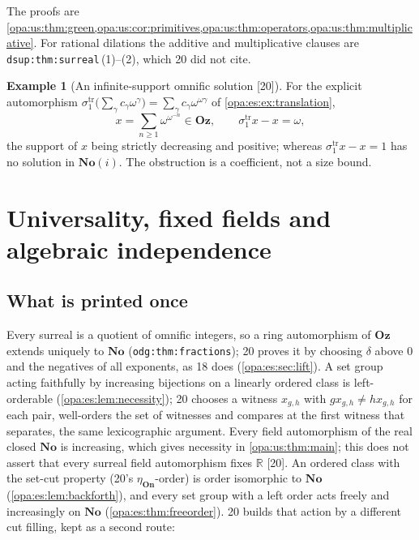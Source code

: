 \documentclass[11pt,oneside]{article}
\numberwithin{equation}{section}
\theoremstyle{definition}
\newtheorem{example}[example]{Example}
\theoremstyle{remark}
\newcommand{\No}{\mathbf{No}}
\newcommand{\Oz}{\mathbf{Oz}}
\newcommand{\SC}{\mathbf{No}(i)}
\newcommand{\R}{\mathbb R}
\newcommand{\src}[1]{\textup{\textsf{\small[#1]}}}
\newcommand{\lbl}[1]{\nolinkurl{#1}}
\newcommand{\On}{\mathbf{On}}
\begin{document}
The proofs are \cref{opa:us:thm:green,opa:us:cor:primitives,opa:us:thm:operators,opa:us:thm:multiplicative}. For rational dilations the
additive and multiplicative clauses are \lbl{dsup:thm:surreal}\,(1)--(2), which 20 did not cite.

\begin{example}[An infinite-support omnific solution \src{20}]\label{opa:us:ex:opening}
For the explicit automorphism $\sigma^{\mathrm{tr}}_1\bigl(\sum_\gamma c_\gamma\omega^\gamma\bigr)=\sum_\gamma c_\gamma\omega^{\omega\gamma}$ of
\cref{opa:es:ex:translation},
\begin{equation}\label{opa:us:eq:opening}
 x=\sum_{n\ge1}\omega^{\omega^{-n}}\in\Oz,\qquad \sigma^{\mathrm{tr}}_1x-x=\omega ,
\end{equation}
the support of $x$ being strictly decreasing and positive; whereas $\sigma^{\mathrm{tr}}_1x-x=1$ has no solution in $\SC$. The obstruction is a
coefficient, not a size bound.
\end{example}

\section{Universality, fixed fields and algebraic independence}\label{opa:us:sec:universal}

\subsection{What is printed once}

Every surreal is a quotient of omnific integers, so a ring automorphism of $\Oz$ extends uniquely to $\No$ (\lbl{odg:thm:fractions}); 20
proves it by choosing $\delta$ above $0$ and the negatives of all exponents, as 18 does (\cref{opa:es:sec:lift}). A set group acting
faithfully by increasing bijections on a linearly ordered class is left-orderable (\cref{opa:es:lem:necessity}); 20 chooses a witness
$x_{g,h}$ with $gx_{g,h}\ne hx_{g,h}$ for each pair, well-orders the set of witnesses and compares at the first witness that separates, the
same lexicographic argument. Every field automorphism of the real closed $\No$ is increasing, which gives necessity in
\cref{opa:us:thm:main}; this does not assert that every surreal field automorphism fixes $\R$ \src{20}. An ordered class with the
set-cut property (20's $\eta_\On$-order) is order isomorphic to $\No$ (\cref{opa:es:lem:backforth}), and every set group with a left
order acts freely and increasingly on $\No$ (\cref{opa:es:thm:freeorder}). 20 builds that action by a different cut filling, kept as a
second route:
\end{document}
